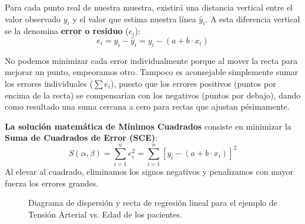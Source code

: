 \documentclass[11pt,a4paper]{article}
\begin{document}
    Para cada punto real de nuestra muestra, existirá una distancia vertical entre el valor observado $y_i$ y el valor que estima nuestra línea $\hat{y}_i$. A esta diferencia vertical se la denomina \textbf{error o residuo} ($e_i$):
    \[ e_i = y_i - \hat{y}_i = y_i - (a + b \cdot x_i) \]

    No podemos minimizar cada error individualmente porque al mover la recta para mejorar un punto, empeoramos otro. Tampoco es aconsejable simplemente sumar los errores individuales ($\sum e_i$), puesto que los errores positivos (puntos por encima de la recta) se compensarían con los negativos (puntos por debajo), dando como resultado una suma cercana a cero para rectas que ajustan pésimamente.

    \textbf{La solución matemática de Mínimos Cuadrados} consiste en minimizar la \textbf{Suma de Cuadrados de Error (SCE)}:
    \[ S(\alpha, \beta) = \sum_{i=1}^n e_i^2 = \sum_{i=1}^n \left[ y_i - (a + b \cdot x_i) \right]^2 \]
    Al elevar al cuadrado, eliminamos los signos negativos y penalizamos con mayor fuerza los errores grandes.

    \begin{figure}[htbp]
        \centering
        \caption{Diagrama de dispersión y recta de regresión lineal para el ejemplo de Tensión Arterial vs. Edad de los pacientes.}
        \label{fig:tension}
    \end{figure}
 
\end{document}
